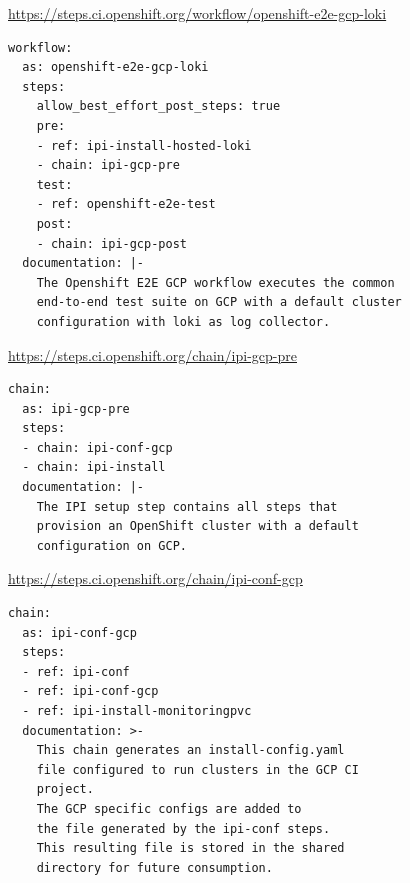 \begin{frame}[fragile]
    \autotitle
    \footnotesize
    \url{https://steps.ci.openshift.org/workflow/openshift-e2e-gcp-loki}
    \small
    \begin{verbatim}
workflow:
  as: openshift-e2e-gcp-loki
  steps:
    allow_best_effort_post_steps: true
    pre:
    - ref: ipi-install-hosted-loki
    - chain: ipi-gcp-pre
    test:
    - ref: openshift-e2e-test
    post:
    - chain: ipi-gcp-post
  documentation: |-
    The Openshift E2E GCP workflow executes the common
    end-to-end test suite on GCP with a default cluster
    configuration with loki as log collector.
    \end{verbatim}
\end{frame}

\begin{frame}[fragile]
    \autotitle
    \url{https://steps.ci.openshift.org/chain/ipi-gcp-pre}
    \begin{verbatim}
chain:
  as: ipi-gcp-pre
  steps:
  - chain: ipi-conf-gcp
  - chain: ipi-install
  documentation: |-
    The IPI setup step contains all steps that
    provision an OpenShift cluster with a default
    configuration on GCP.
    \end{verbatim}
\end{frame}

\begin{frame}[fragile]
    \autotitle
    \url{https://steps.ci.openshift.org/chain/ipi-conf-gcp}
    \begin{verbatim}
chain:
  as: ipi-conf-gcp
  steps:
  - ref: ipi-conf
  - ref: ipi-conf-gcp
  - ref: ipi-install-monitoringpvc
  documentation: >-
    This chain generates an install-config.yaml
    file configured to run clusters in the GCP CI
    project.
    The GCP specific configs are added to
    the file generated by the ipi-conf steps.
    This resulting file is stored in the shared
    directory for future consumption.
    \end{verbatim}
\end{frame}

